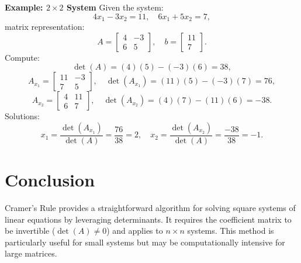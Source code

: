\documentclass{article}
\begin{document}
\textbf{Example: $2 \times 2$ System}
Given the system:
\[
  4x_1 - 3x_2 = 11, \quad 6x_1 + 5x_2 = 7,
\]
matrix representation:
\[
  A =
  \begin{bmatrix}
    4 & -3 \\
    6 & 5
  \end{bmatrix},
  \quad
  b =
  \begin{bmatrix}
    11 \\
    7
  \end{bmatrix}.
\]
Compute:
\[
  \det(A) = (4)(5) - (-3)(6) = 38,
\]
\[
  A_{x_1} =
  \begin{bmatrix}
    11 & -3 \\
    7 & 5
  \end{bmatrix},
  \quad
  \det(A_{x_1}) = (11)(5) - (-3)(7) = 76,
\]
\[
  A_{x_2} =
  \begin{bmatrix}
    4 & 11 \\
    6 & 7
  \end{bmatrix},
  \quad
  \det(A_{x_2}) = (4)(7) - (11)(6) = -38.
\]
Solutions:
\[
  x_1 = \frac{\det(A_{x_1})}{\det(A)} = \frac{76}{38} = 2, \quad x_2 = \frac{\det(A_{x_2})}{\det(A)} = \frac{-38}{38} = -1.
\]

\section*{Conclusion}

Cramer’s Rule provides a straightforward algorithm for solving square systems of linear equations by leveraging determinants. It requires the coefficient matrix to be invertible ($\det(A) \neq 0$) and applies to $n \times n$ systems. This method is particularly useful for small systems but may be computationally intensive for large matrices.
\end{document}
